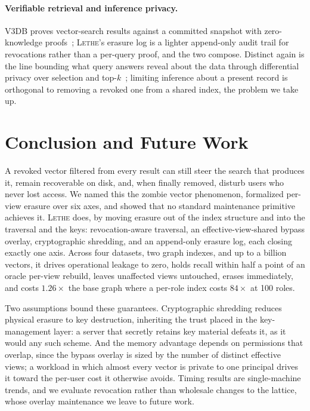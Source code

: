 \documentclass[sigconf, nonacm, review]{acmart}
\begin{document}
\paragraph{Verifiable retrieval and inference privacy.}
V3DB proves vector-search results
against a committed snapshot with zero-knowledge
proofs~\cite{DBLP:journals/corr/abs-2603-03065}; \textsc{Lethe}'s
erasure log is a lighter append-only audit trail for revocations rather than
a per-query proof, and the two compose. Distinct again is the line
bounding what query answers reveal about the data through differential privacy
over selection and top-$k$~\cite{DBLP:conf/focs/McSherryT07,DBLP:conf/nips/DurfeeR19,DBLP:conf/icml/GillenwaterJMD22};
limiting inference about a present record is orthogonal to removing a
revoked one from a shared index, the problem we take up.

\section{Conclusion and Future Work}
\label{sec:conclusion}

A revoked vector filtered from every result can still steer the
search that produces it, remain recoverable on disk, and, when finally
removed, disturb users who never lost access. We named this the zombie vector
phenomenon, formalized per-view erasure over six axes, and showed that no
standard maintenance primitive achieves it. \textsc{Lethe} does, by moving
erasure out of the index structure and into the traversal and the keys:
revocation-aware traversal, an effective-view-shared bypass overlay,
cryptographic shredding, and an append-only erasure log, each closing exactly one
axis. Across four datasets, two graph indexes, and up to a billion
vectors, it drives operational leakage to zero, holds recall within half a
point of an oracle per-view rebuild, leaves unaffected views untouched, erases
immediately, and costs $1.26\times$ the base graph where a per-role index
costs $84\times$ at 100 roles.

Two assumptions bound these guarantees. Cryptographic shredding reduces
physical erasure to key destruction, inheriting the trust placed in the
key-management layer: a server that secretly retains key material defeats it,
as it would any such scheme. And the memory advantage
depends on permissions that overlap, since the bypass overlay is sized by the
number of distinct effective views; a workload in which almost every vector is private to one
principal drives it toward the per-user cost it otherwise avoids. Timing
results are single-machine trends, and we evaluate revocation rather than
wholesale changes to the lattice, whose overlay maintenance we leave to future
work.
\end{document}
